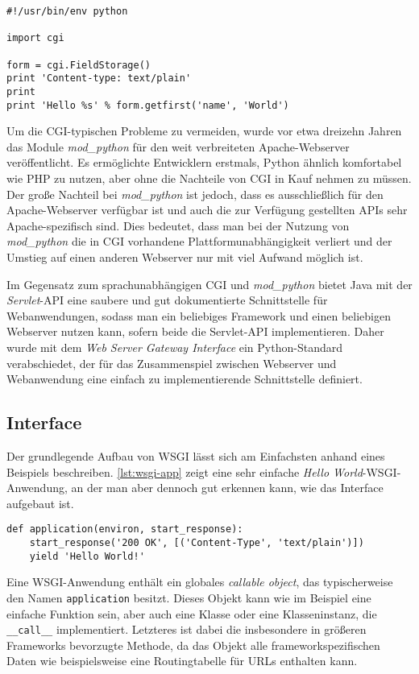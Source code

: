 \begin{lstlisting}[caption=Python-CGI-Script,label=lst:python-cgi]
#!/usr/bin/env python

import cgi

form = cgi.FieldStorage()
print 'Content-type: text/plain'
print
print 'Hello %s' % form.getfirst('name', 'World')
\end{lstlisting}

Um die CGI-typischen Probleme zu vermeiden, wurde vor etwa dreizehn Jahren das Module
\emph{mod\_python} für den weit verbreiteten Apache-Webserver veröffentlicht. Es ermöglichte
Entwicklern erstmals, Python ähnlich komfortabel wie PHP zu nutzen, aber ohne die Nachteile von CGI
in Kauf nehmen zu müssen. Der große Nachteil bei \emph{mod\_python} ist jedoch, dass es
ausschließlich für den Apache-Webserver verfügbar ist und auch die zur Verfügung gestellten APIs
sehr Apache-spezifisch sind. Dies bedeutet, dass man bei der Nutzung von \emph{mod\_python} die in
CGI vorhandene Plattformunabhängigkeit verliert und der Umstieg auf einen anderen Webserver nur mit
viel Aufwand möglich ist.

Im Gegensatz zum sprachunabhängigen CGI und \emph{mod\_python} bietet Java mit der \emph{Servlet}-API
eine saubere und gut dokumentierte Schnittstelle für Webanwendungen, sodass man ein beliebiges
Framework und einen beliebigen Webserver nutzen kann, sofern beide die Servlet-API implementieren.
Daher wurde mit dem \emph{Web Server Gateway Interface} ein Python-Standard verabschiedet, der für
das Zusammenspiel zwischen Webserver und Webanwendung eine einfach zu implementierende Schnittstelle
definiert.


\subsection{Interface}

Der grundlegende Aufbau von WSGI lässt sich am Einfachsten anhand eines Beispiels beschreiben.
\autoref{lst:wsgi-app} zeigt eine sehr einfache \emph{Hello World}-WSGI-Anwendung, an der man aber
dennoch gut erkennen kann, wie das Interface aufgebaut ist.

\begin{lstlisting}[caption=Einfache WSGI-Applikation,label=lst:wsgi-app]
def application(environ, start_response):
    start_response('200 OK', [('Content-Type', 'text/plain')])
    yield 'Hello World!'
\end{lstlisting}

Eine WSGI-Anwendung enthält ein globales \emph{callable object}, das typischerweise den Namen
\lstinline{application} besitzt. Dieses Objekt kann wie im Beispiel eine einfache Funktion sein,
aber auch eine Klasse oder eine Klasseninstanz, die \lstinline{__call__} implementiert. Letzteres
ist dabei die insbesondere in größeren Frameworks bevorzugte Methode, da das Objekt alle
frameworkspezifischen Daten wie beispielsweise eine Routingtabelle für URLs enthalten kann.


